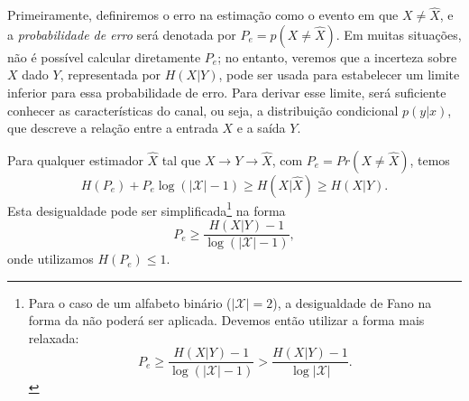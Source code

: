 Primeiramente, definiremos o erro na estimação como o evento em que $X \neq \hat{X}$, e a
\emph{probabilidade de erro} será denotada por $P_e = p(X \neq \hat{X})$. Em muitas situações, não é
possível calcular diretamente $P_e$; no entanto, veremos que a incerteza sobre $X$ dado $Y$, 
representada por $H(X|Y)$, pode ser usada para estabelecer um
limite inferior para essa probabilidade de erro. Para derivar esse limite, será
suficiente conhecer as características do canal, ou seja, a distribuição
condicional $p(y|x)$, que descreve a relação entre a entrada $X$ e a saída $Y$.



\begin{theorem}\label{thm:desfano}
  Para qualquer estimador $\hat{X}$ tal que $X \rightarrow Y \rightarrow \hat{X}$, com
  $P_e = Pr(X \neq \hat{X})$, temos
  \begin{equation}\label{eq:desfano}
    H(P_e) + P_e \log \left( \vert \mathcal{X} \vert - 1 \right) \geq H(X|\hat{X}) \geq H(X|Y) .
  \end{equation}
  Esta desigualdade pode ser simplificada\footnote{
    Para o caso de um alfabeto binário ($\vert \mathcal{X} \vert = 2$),
    a desigualdade de Fano na forma da 
    não poderá ser aplicada. Devemos então utilizar a forma mais relaxada:
    \begin{equation}
      P_e \geq \frac{H(X|Y) - 1}{\log \left( \vert \mathcal{X} \vert - 1 \right)}
         > \frac{H(X|Y) - 1}{\log \vert \mathcal{X} \vert } .
    \end{equation}
  } na forma
  \begin{equation}\label{eq:desfanorelax}
  P_e \geq \frac{H(X|Y) - 1}{\log \left( \vert \mathcal{X} \vert - 1 \right)} ,
  \end{equation}
  onde utilizamos $H(P_e) \leq 1$.
\end{theorem}
